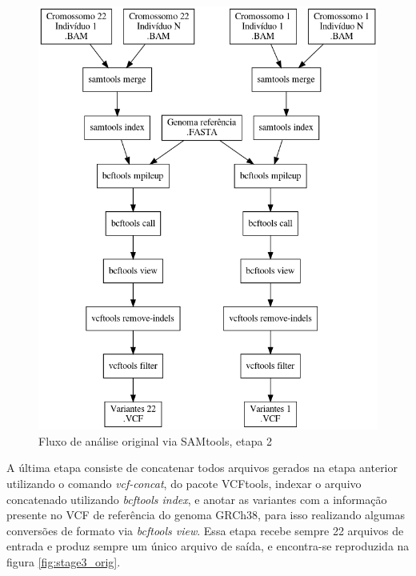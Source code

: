 \documentclass[cic,tc]{iiufrgs}
\begin{document}
\begin{figure}
  \caption{Fluxo de análise original via SAMtools, etapa 2}
    \begin{center}
      \includegraphics[width=0.85\linewidth]{img/stage2_orig.png}
    \end{center}
    \label{fig:stage2_orig}
\end{figure}

A última etapa consiste de concatenar todos arquivos gerados na etapa anterior
utilizando o comando \textit{vcf-concat}, do pacote
VCFtools,\cite{10.1093/bioinformatics/btr330} indexar o arquivo concatenado
utilizando \textit{bcftools index}, e anotar as variantes com a informação
presente no VCF de referência do genoma GRCh38, para isso realizando algumas
conversões de formato via \textit{bcftools view}. Essa etapa recebe sempre 22
arquivos de entrada e produz sempre um único arquivo de saída, e encontra-se
reproduzida na figura \ref{fig:stage3_orig}.
\end{document}
